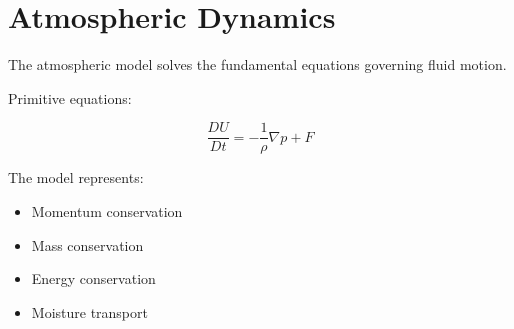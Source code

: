 \section{Atmospheric Dynamics}


The atmospheric model solves the fundamental equations
governing fluid motion.



Primitive equations:


\[
\frac{DU}{Dt}
=
-\frac{1}{\rho}\nabla p
+
F
\]



The model represents:


\begin{itemize}

\item Momentum conservation

\item Mass conservation

\item Energy conservation

\item Moisture transport

\end{itemize}
